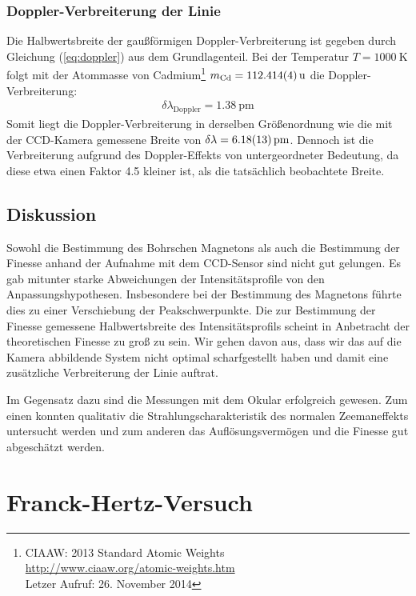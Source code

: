 \documentclass[11pt, a4paper]{article}
\begin{document}
\subsubsection{Doppler-Verbreiterung der Linie}
Die Halbwertsbreite der gaußförmigen Doppler-Verbreiterung ist gegeben durch Gleichung (\ref{eq:doppler}) aus dem Grundlagenteil.
Bei der Temperatur $T = \SI{1000}{\K}$ folgt mit der Atommasse von Cadmium\footnote{CIAAW: 2013 Standard Atomic Weights\\\url{http://www.ciaaw.org/atomic-weights.htm}\\Letzer Aufruf: 26. November 2014} $m_\mathrm{Cd} = \SI{112.414 +- 0.004}{\atomicmassunit} $ die Doppler-Verbreiterung:
\begin{align*}
	\delta \lambda_\mathrm{Doppler} = \SI{1.38}{\pico\metre}
\end{align*}
Somit liegt die Doppler-Verbreiterung in derselben Größenordnung wie die mit der CCD-Kamera gemessene Breite von $\delta \lambda = \SI{6.18 +- 0.13}{\pico\metre}$.
Dennoch ist die Verbreiterung aufgrund des Doppler-Effekts von untergeordneter Bedeutung, da diese etwa einen Faktor \num{4.5} kleiner ist, als die tatsächlich beobachtete Breite.

\subsection{Diskussion}
\label{ssec:diskussion_zeeman}
Sowohl die Bestimmung des Bohrschen Magnetons als auch die Bestimmung der Finesse anhand der Aufnahme mit dem CCD-Sensor sind nicht gut gelungen.
Es gab mitunter starke Abweichungen der Intensitätsprofile von den Anpassungshypothesen.
Insbesondere bei der Bestimmung des Magnetons führte dies zu einer Verschiebung der Peakschwerpunkte.
Die zur Bestimmung der Finesse gemessene Halbwertsbreite des Intensitätsprofils scheint in Anbetracht der theoretischen Finesse zu groß zu sein.
Wir gehen davon aus, dass wir das auf die Kamera abbildende System nicht optimal scharfgestellt haben und damit eine zusätzliche Verbreiterung der Linie auftrat.

Im Gegensatz dazu sind die Messungen mit dem Okular erfolgreich gewesen.
Zum einen konnten qualitativ die Strahlungscharakteristik des normalen Zeemaneffekts untersucht werden und zum anderen das Auflösungsvermögen und die Finesse gut abgeschätzt werden.

\section{Franck-Hertz-Versuch}
\end{document}
